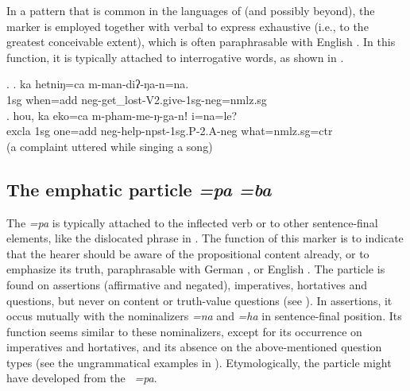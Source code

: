  
In a pattern that is common in the languages of  (and possibly beyond), the  marker is employed together with verbal  to express exhaustive  (i.e., to the greatest conceivable extent),  which is often paraphrasable with  English . In this function, it is typically attached to interrogative words, as shown in \Next.
 
 \ex. \ag. ka hetniŋ=ca m-man-diʔ-ŋa-n=na.\\
 {\sc 1sg} when{\sc =add} {\sc neg-}get\_lost{\sc -V2.give-1sg-neg=nmlz.sg}\\
 \bg. hou,   ka       eko=ca        m-pham-me-ŋ-ga-nǃ                    i=na=le?\\
 {\sc excla} {\sc 1sg} one{\sc =add} {\sc neg-}help{\sc -npst-1sg.P-2.A-neg} what{\sc =nmlz.sg=ctr}\\
  (a complaint uttered while singing a song) 
 


\subsection{The emphatic particle \emph{=pa \ti =ba}}

The  \emph{=pa} is typically attached to the inflected verb or to other sentence-final elements, like the dislocated phrase in \Next[a]. The function of this marker is to indicate that the hearer should be aware of the propositional content already, or to emphasize its truth, paraphrasable with German , or English . The particle is found on assertions (affirmative and negated), imperatives, hortatives and  questions, but never on content or truth-value questions (see \Next).  In assertions, it occus mutually  with the nominalizers \emph{=na} and \emph{=ha} in sentence-final position. Its function seems similar to these nominalizers, except for its occurrence on imperatives and hortatives, and its absence on the above-mentioned question types (see the ungrammatical examples in \NNext). Etymologically, the particle might have developed from the ~\emph{=pa}. 

